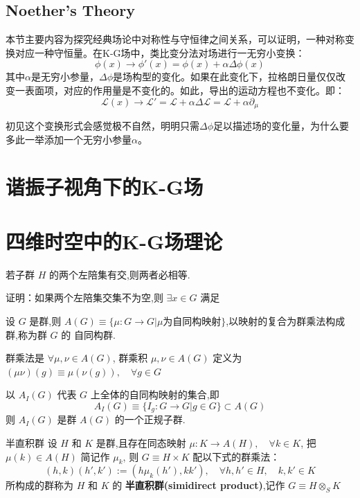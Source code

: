 \documentclass[../main.tex]{subfiles}
\begin{document}
\subsection{Noether's Theory}
    本节主要内容为探究经典场论中对称性与守恒律之间关系，可以证明，一种对称变换对应一种守恒量。在K-G场中，类比变分法对场进行一无穷小变换：
    \begin{equation}
        \phi(x) \rightarrow \phi'(x) = \phi(x) + \alpha \Delta \phi(x)
    \end{equation}
    其中$\alpha$是无穷小参量，$\Delta \phi$是场构型的变化。如果在此变化下，拉格朗日量仅仅改变一表面项，对应的作用量是不变化的。如此，导出的运动方程也不变化。即：
    \begin{equation}
        \mathcal{L}(x)\rightarrow \mathcal{L}' = \mathcal{L} + \alpha \Delta \mathcal{L} = \mathcal{L} + \alpha \partial_{\mu}
    \end{equation}

\begin{note}
    初见这个变换形式会感觉极不自然，明明只需$\Delta \phi$足以描述场的变化量，为什么要多此一举添加一个无穷小参量$\alpha$。
\end{note}

\section{谐振子视角下的K-G场}
\section{四维时空中的K-G场理论}
\begin{note}
    若子群 $H$ 的两个左陪集有交,则两者必相等.
\end{note}
    \noindent
    证明：如果两个左陪集交集不为空,则 $\exists x \in G$ 满足

\begin{definition}
    设 $G$ 是群,则 $A(G)\equiv \{\mu:G\rightarrow G|\mu\text{为自同构映射}\}$,以映射的复合为群乘法构成群,称为群 $G$ 的 自同构群.

    群乘法是 $\forall \mu,\nu \in A(G)$, 群乘积 $\mu,\nu \in A(G)$ 定义为 $(\mu\nu)(g) \equiv \mu(\nu(g)),\quad \forall g \in G$
\end{definition}
\begin{theorem}
     以 $A_I(G)$ 代表 $G$ 上全体的自同构映射的集合,即
     $$
     A_I(G)\equiv\{I_g: G\rightarrow G|g \in G\}\subset A(G)
     $$
则 $A_I(G)$ 是群 $A(G)$ 的一个正规子群.
\end{theorem}
\begin{definition}{}{半直积群}
设 $H$ 和 $K$ 是群,且存在同态映射 $\mu:K\rightarrow A(H),\quad \forall k \in K$, 把 $\mu(k)\in A(H)$ 简记作 $\mu_k$, 则 $G\equiv H\times K$ 配以下式的群乘法：
    $$
    (h, k)(h', k'):=(h\mu_k(h'), kk'),\quad\forall h, h'\in H,\quad k, k' \in K
    $$
所构成的群称为 $H$ 和 $K$ 的 \textbf{半直积群(simidirect product)},记作 $G\equiv H\otimes_{S}K$
\end{definition}
\end{document}

